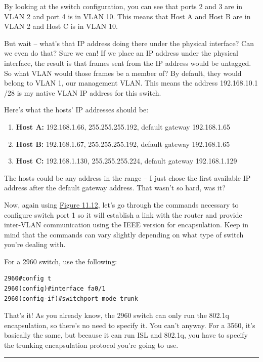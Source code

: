 \documentclass[b5paper,11pt]{memoir}
\begin{document}
By looking at the switch configuration, you can see that ports 2 and 3
are in VLAN 2 and port 4 is in VLAN 10. This means that Host A and Host
B are in VLAN 2 and Host C is in VLAN 10.

But wait -- what's that IP address doing there under the physical
interface? Can we even do that? Sure we can! If we place an IP address
under the physical interface, the result is that frames sent from the IP
address would be untagged. So what VLAN would those frames be a member
of? By default, they would belong to VLAN 1, our management VLAN. This
means the address 192.168.10.1 /28 is my native VLAN IP address for this
switch.

Here's what the hosts' IP addresses should be:

\begin{enumerate}
\tightlist
\item
  \textbf{Host A:} 192.168.1.66, 255.255.255.192, default gateway
  192.168.1.65
\item
  \textbf{Host B:} 192.168.1.67, 255.255.255.192, default gateway
  192.168.1.65
\item
  \textbf{Host C:} 192.168.1.130, 255.255.255.224, default gateway
  192.168.1.129
\end{enumerate}

The hosts could be any address in the range -- I just chose the first
available IP address after the default gateway address. That wasn't so
hard, was it?

Now, again using \protect\hyperlink{c11.xhtmlux5cux23figure11-12}{Figure
11.12}, let's go through the commands necessary to configure switch port
1 so it will establish a link with the router and provide inter-VLAN
communication using the IEEE version for encapsulation. Keep in mind
that the commands can vary slightly depending on what type of switch
you're dealing with.

For a 2960 switch, use the following:

\begin{verbatim}
2960#config t
2960(config)#interface fa0/1
2960(config-if)#switchport mode trunk
\end{verbatim}

That's it! As you
already know, the 2960 switch can only run the 802.1q encapsulation, so
there's no need to specify it. You can't anyway. For a 3560, it's
basically the same, but because it can run ISL and 802.1q, you have to
specify the trunking encapsulation protocol you're going to use.

\begin{center}\rule{0.5\linewidth}{0.5pt}\end{center}
\end{document}
